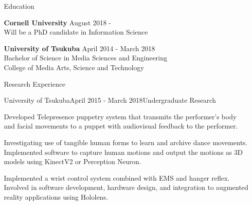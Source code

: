 \documentclass{resume} %
\begin{document}

\begin{rSection}{Education}

{\bf Cornell University} \hfill {August 2018 - }
\\ Will be a PhD candidate in Information Science

{\bf University of Tsukuba} \hfill {April 2014 - March 2018}
\\ Bachelor of Science in Media Sciences and Engineering
\\ College of Media Arts, Science and Technology


\end{rSection}


\begin{rSection}{Research Experience}

\begin{rSubsection}{University of Tsukuba}{April 2015 - March 2018}{Undergraduate Research}{}
\item Developed Telepresence puppetry system that transmits the performer's body and facial movements to a puppet with audiovisual feedback to the performer.
\item Investigating use of tangible human forms to learn and archive dance movements. Implemented software to capture human motions and output the motions as 3D models using KinectV2 or Perception Neuron.
\item Implemented a wrist control system combined with EMS and hanger reflex. Involved in software development, hardware design, and integration to augmented reality applications using Hololens.
\end{rSubsection}




\end{rSection}
\end{document}
